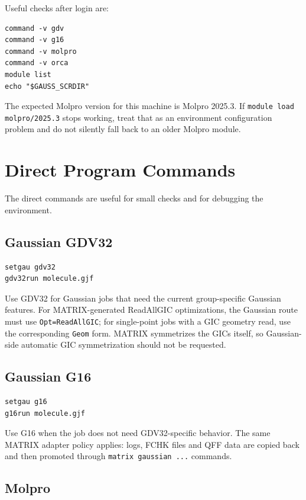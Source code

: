 \documentclass[11pt]{article}
\begin{document}
Useful checks after login are:

\begin{lstlisting}[style=matrix]
command -v gdv
command -v g16
command -v molpro
command -v orca
module list
echo "$GAUSS_SCRDIR"
\end{lstlisting}

The expected Molpro version for this machine is Molpro 2025.3.  If
\texttt{module load molpro/2025.3} stops working, treat that as an environment
configuration problem and do not silently fall back to an older Molpro module.

\section{Direct Program Commands}

The direct commands are useful for small checks and for debugging the
environment.

\subsection{Gaussian GDV32}

\begin{lstlisting}[style=matrix]
setgau gdv32
gdv32run molecule.gjf
\end{lstlisting}

Use GDV32 for Gaussian jobs that need the current group-specific Gaussian
features.  For MATRIX-generated ReadAllGIC optimizations, the Gaussian route
must use \texttt{Opt=ReadAllGIC}; for single-point jobs with a GIC geometry
read, use the corresponding \texttt{Geom} form.  MATRIX symmetrizes the GICs
itself, so Gaussian-side automatic GIC symmetrization should not be requested.

\subsection{Gaussian G16}

\begin{lstlisting}[style=matrix]
setgau g16
g16run molecule.gjf
\end{lstlisting}

Use G16 when the job does not need GDV32-specific behavior.  The same MATRIX
adapter policy applies: logs, FCHK files and QFF data are copied back and then
promoted through \texttt{matrix gaussian ...} commands.

\subsection{Molpro}
\end{document}
